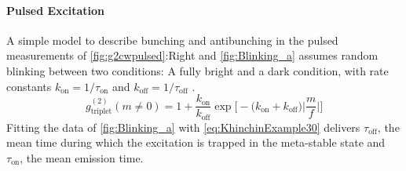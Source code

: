 \paragraph{Pulsed Excitation}
A simple model to describe bunching and antibunching in the pulsed measurements of \cref{fig:g2cwpulsed}:Right and \cref{fig:Blinking_a} assumes random blinking between two conditions: A fully bright and a dark condition, with rate constants $k_\mathrm{on}=1/\tau_\mathrm{on}$ and $k_\mathrm{off}=1/\tau_\mathrm{off}$ \cite{beveratos_room_2002,santori_triggered_2001}. 
\begin{equation}\label{eq:KhinchinExample30}
	g^{(2)}_\mathrm{triplet}(m\neq0) = 1 + \dfrac{k_\mathrm{on}}{k_\mathrm{off}}\exp\Big[-\Big(k_\mathrm{on}+k_\mathrm{off}\Big)\Big|\dfrac{m}{f}\Big|\Big]
\end{equation}
Fitting the data of \cref{fig:Blinking_a} with \cref{eq:KhinchinExample30} delivers $\tau_\mathrm{off}$, the mean time during which the excitation is trapped in the meta-stable state and $\tau_\mathrm{on}$, the mean emission time.

